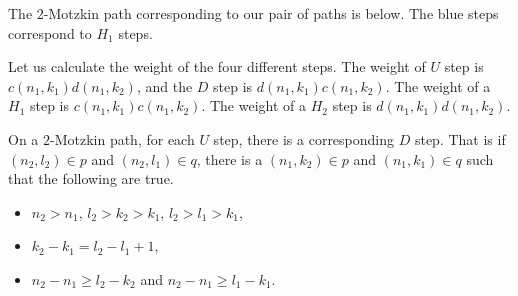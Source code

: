 \documentclass{article}
\theoremstyle{definition}
\numberwithin{equation}{section}
\begin{document}
The $2$-Motzkin path corresponding to our pair of paths is below. The blue steps correspond to $H_1$ steps.
\begin{center}
\end{center}

Let us calculate the weight of the four different steps. The weight of $U$ step is $c(n_1,k_1)d(n_1,k_2)$, and the $D$ step is $d(n_1,k_1)c(n_1,k_2)$. The weight of a $H_1$ step is $c(n_1,k_1)c(n_1,k_2)$. The weight of a $H_2$ step is $d(n_1,k_1)d(n_1,k_2)$.

 On a $2$-Motzkin path, for each $U$ step, there is a corresponding $D$ step. That is if $(n_2,l_2)\in p$ and $(n_2,l_1)\in q$, there is a $(n_1,k_2)\in p$ and $(n_1,k_1)\in q$ such that the following are true.
 \begin{itemize}
     \item $n_2>n_1$, $l_2>k_2>k_1$, $l_2>l_1>k_1$,
     \item $k_2-k_1=l_2-l_1+1$,
     \item $n_2-n_1\ge l_2-k_2$ and $n_2-n_1\ge l_1-k_1$.
 \end{itemize}
\end{document}
